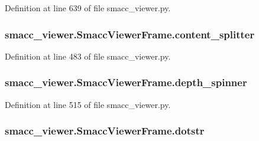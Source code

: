 Definition at line 639 of file smacc\+\_\+viewer.\+py.

\subsubsection[{\texorpdfstring{content\+\_\+splitter}{content_splitter}}]{\setlength{\rightskip}{0pt plus 5cm}smacc\+\_\+viewer.\+Smacc\+Viewer\+Frame.\+content\+\_\+splitter}\hypertarget{classsmacc__viewer_1_1SmaccViewerFrame_a601f77701e7f32378b77b1b154e27215}{}\label{classsmacc__viewer_1_1SmaccViewerFrame_a601f77701e7f32378b77b1b154e27215}


Definition at line 483 of file smacc\+\_\+viewer.\+py.

\subsubsection[{\texorpdfstring{depth\+\_\+spinner}{depth_spinner}}]{\setlength{\rightskip}{0pt plus 5cm}smacc\+\_\+viewer.\+Smacc\+Viewer\+Frame.\+depth\+\_\+spinner}\hypertarget{classsmacc__viewer_1_1SmaccViewerFrame_abb2756c3503845a85a64c99a7479af63}{}\label{classsmacc__viewer_1_1SmaccViewerFrame_abb2756c3503845a85a64c99a7479af63}


Definition at line 515 of file smacc\+\_\+viewer.\+py.

\subsubsection[{\texorpdfstring{dotstr}{dotstr}}]{\setlength{\rightskip}{0pt plus 5cm}smacc\+\_\+viewer.\+Smacc\+Viewer\+Frame.\+dotstr}\hypertarget{classsmacc__viewer_1_1SmaccViewerFrame_af4c9a551ac2933b05aaae2adcbb26d63}{}\label{classsmacc__viewer_1_1SmaccViewerFrame_af4c9a551ac2933b05aaae2adcbb26d63}


